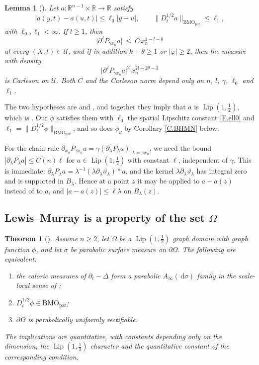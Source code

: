 \documentclass[12pt,leqno]{amsart}
\numberwithin{equation}{section}
\DeclareMathOperator{\Lip}{Lip}
\newcommand{\R}{\mathbb R}
\newcommand{\abs}[1]{\left\vert#1\right\vert}
\newcommand{\br}[1]{\left(#1\right)}
\newcommand{\om}{\Omega}
\newcommand{\pd}{\partial}
\newcommand{\dhalf}{D_t^{1/2}}
\newcommand{\BMOpar}{\mathrm{BMO}_{\mathrm{par}}}
\newcommand{\Uc}{\mathcal U}
\renewcommand{\d}{\,\mathrm d}
\theoremstyle{plain}
\newtheorem{theorem}[equation]{Theorem}
\newtheorem{lemma}[equation]{Lemma}
\theoremstyle{remark}
\begin{document}
\begin{lemma}[{\cite[Chapter I, Lemma A]{HLmem}}]\label{L.HL}
Let $a:\R^{n-1}\times\R\to\R$ satisfy
$$\abs{a(y,t)-a(u,t)}\le\ell_0\abs{y-u},\qquad
  \big\|\dhalf a\big\|_{\BMOpar}\le\ell_1 ,$$
with $\ell_0,\ell_1<\infty$. If $l\ge1$, then
\begin{equation}\label{E.mollbds}
  \big|\pd^{\,l}P_{\gamma x_n}a\big|\ \le\ C\,x_n^{1-l-\theta}
\end{equation}
at every $(X,t)\in\Uc$, and if in addition $k+\theta\ge1$ or
$\abs\varphi\ge2$, then the measure with density
\begin{equation}\label{E.mollcarl}
  \big|\pd^{\,l}P_{\gamma x_n}a\big|^2\,x_n^{2l+2\theta-3}
\end{equation}
is Carleson on $\Uc$. Both $C$ and the Carleson norm depend only on $n$, $l$,
$\gamma$, $\ell_0$ and $\ell_1$.
\end{lemma}

\noindent The two hypotheses are \cite[(1.3)]{HLmem} and \cite[(1.4)]{HLmem},
and together they imply that $a$ is $\Lip(1,\tfrac12)$, which is
\cite[(1.5)]{HLmem}. Our $\phi$ satisfies them with $\ell_0$ the spatial
Lipschitz constant \eqref{E.ell0} and $\ell_1=\|\dhalf\phi\|_{\BMOpar}$, and so
does $\phi_\nu$ by Corollary \ref{C.BHMN} below.\medskip

\noindent For the chain rule
$\pd_{x_n}P_{\gamma x_n}a
=\gamma(\pd_\lambda P_\lambda a)|_{\lambda=\gamma x_n}$,
we need the bound $|\pd_\lambda P_\lambda a|\le C(n)\ell$ for
$a\in\Lip(1,\tfrac12)$ with constant $\ell$, independent of $\gamma$.
This is immediate:
$\pd_\lambda P_\lambda a=\lambda^{-1}\br{\lambda\pd_\lambda\vartheta_\lambda}*a$,
and the kernel $\lambda\pd_\lambda\vartheta_\lambda$ has integral zero and is
supported in $B_\lambda$. Hence at a point $z$ it may be applied to $a-a(z)$
instead of to $a$, and $\abs{a-a(z)}\le\ell\lambda$ on $B_\lambda(z)$.

\subsection{Lewis--Murray is a property of the set $\om$}\label{ss.BHMN}

\begin{theorem}[{\cite[Theorem 1.2]{BHMN}}]\label{T.BHMN}
Assume $n\ge2$, let $\om$ be a $\Lip(1,\tfrac12)$ graph domain with graph
function $\phi$, and let $\sigma$ be parabolic surface measure on $\pd\om$.
The following are equivalent:
\begin{enumerate}
\item the caloric measures of $\pd_t-\Delta$ form a parabolic
  $A_\infty(\d\sigma)$ family in the scale-local sense of
  \cite[Definition 3.18]{BHMN};
\item $\dhalf\phi\in\BMOpar$;
\item $\pd\om$ is parabolically uniformly rectifiable.
\end{enumerate}
The implications are quantitative, with constants depending only on the
dimension, the $\Lip(1,\tfrac12)$ character and the quantitative constant of
the corresponding condition.
\end{theorem}
\end{document}
